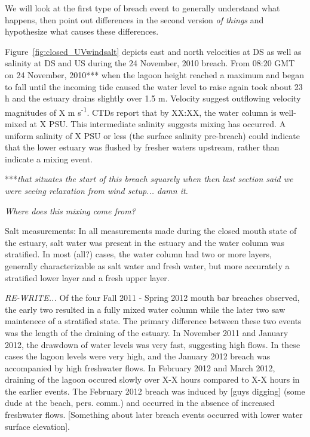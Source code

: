We will look at the first type of breach event to generally understand what happens, then point out differences in the second version \emph{of things} and hypothesize what causes these differences. 

Figure~\ref{fig:closed_UVwindsalt} depicts east and north velocities at DS as well as salinity at DS and US during the 24 November, 2010 breach. From 08:20 GMT on 24 November, 2010*** when the lagoon height reached a maximum and began to fall until the incoming tide caused the water level to raise again took about 23 h and the estuary drains slightly over 1.5 m. Velocity suggest outflowing velocity magnitudes of X m s\textsuperscript{-1}. CTDs report that by XX:XX, the water column is well-mixed at X PSU. This intermediate salinity suggests mixing has occurred. A uniform salinity of X PSU or less (the surface salinity pre-breach) could indicate that the lower estuary was flushed by fresher waters upstream, rather than indicate a mixing event.

***\emph{that situates the start of this breach squarely when then last section said we were seeing relaxation from wind setup... damn it.}

\emph{Where does this mixing come from?}










Salt measurements:
In all measurements made during the closed mouth state of the estuary, salt water was present in the estuary and the water column was stratified. In most (all?) cases, the water column had two or more layers, generally characterizable as salt water and fresh water, but more accurately a stratified lower layer and a fresh upper layer. 

\emph{RE-WRITE...} Of the four Fall 2011 - Spring 2012 mouth bar breaches observed, the early two resulted in a fully mixed water column while the later two saw maintenece of a stratified state. The primary difference between these two events was the length of the draining of the estuary. In November 2011 and January 2012, the drawdown of water levels was very fast, suggesting high flows. In these cases the lagoon levels were very high, and the January 2012 breach was accompanied by high freshwater flows. In February 2012 and March 2012, draining of the lagoon occured slowly over X-X hours compared to X-X hours in the earlier events. The February 2012 breach was induced by [guys digging] (some dude at the beach, pers. comm.) and occurred in the absence of increased freshwater flows. [Something about later breach events occurred with lower water surface elevation].

